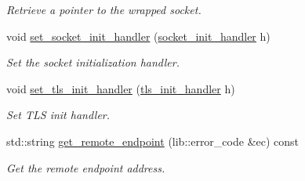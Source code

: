 \begin{DoxyCompactItemize}
\begin{DoxyCompactList}\small\item\em Retrieve a pointer to the wrapped socket. \end{DoxyCompactList}\item 
void \hyperlink{classwebsocketpp_1_1transport_1_1asio_1_1tls__socket_1_1connection_a67e80028e47cb8fb4f0a7f7adf8d9531}{set\+\_\+socket\+\_\+init\+\_\+handler} (\hyperlink{namespacewebsocketpp_1_1transport_1_1asio_1_1tls__socket_a0ec24de8bf054a4bc6f6c018e743efea}{socket\+\_\+init\+\_\+handler} h)
\begin{DoxyCompactList}\small\item\em Set the socket initialization handler. \end{DoxyCompactList}\item 
void \hyperlink{classwebsocketpp_1_1transport_1_1asio_1_1tls__socket_1_1connection_a6d068194c8a9d5602d5717b2f379cb60}{set\+\_\+tls\+\_\+init\+\_\+handler} (\hyperlink{namespacewebsocketpp_1_1transport_1_1asio_1_1tls__socket_a6fe279813cc19b05a3897d20f10f16d2}{tls\+\_\+init\+\_\+handler} h)
\begin{DoxyCompactList}\small\item\em Set T\+L\+S init handler. \end{DoxyCompactList}\item 
std\+::string \hyperlink{classwebsocketpp_1_1transport_1_1asio_1_1tls__socket_1_1connection_abd30777f596cda2f99c864d1c87aa54e}{get\+\_\+remote\+\_\+endpoint} (lib\+::error\+\_\+code \&ec) const 
\begin{DoxyCompactList}\small\item\em Get the remote endpoint address. \end{DoxyCompactList}\end{DoxyCompactItemize}
